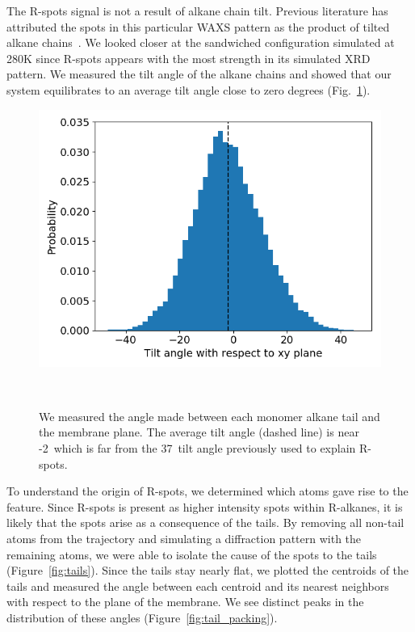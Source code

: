 \documentclass{article}
\begin{document}
  The R-spots signal is not a result of alkane chain tilt. Previous literature
  has attributed the spots in this particular WAXS pattern as the product of tilted alkane
  chains~\cite{feng_scalable_2014}. We looked closer at the sandwiched
  configuration simulated at 280K since R-spots appears with the most strength in 
  its simulated XRD pattern. We measured the tilt angle of the alkane chains and 
  showed that our system equilibrates to an average tilt angle close to zero degrees
  (Fig.~\ref{fig:tilt}). 
  
  \begin{figure}
  \centering
  \includegraphics[width=0.5\linewidth]{tilt_dist.png}
  \caption{We measured the angle made between each monomer alkane tail and the
	  membrane plane. The average tilt angle (dashed line) is near -2\degree~which is far from 
	  the 37\degree~tilt angle previously used to explain R-spots.}~\label{fig:tilt}
  \end{figure}

  To understand the origin of R-spots, we determined which
  atoms gave rise to the feature. Since R-spots is present as higher intensity
  spots within R-alkanes, it is likely that the spots arise as a consequence of
  the tails. By removing all non-tail atoms from the trajectory and simulating a
  diffraction pattern with the remaining atoms, we were able to isolate the cause of 
  the spots to the tails (Figure~\ref{fig:tails}). Since the tails stay nearly flat, we plotted
  the centroids of the tails and measured the angle between each centroid and its
  nearest neighbors with respect to the plane of the membrane. We see distinct
  peaks in the distribution of these angles (Figure~\ref{fig:tail_packing}).

  
\end{document}
